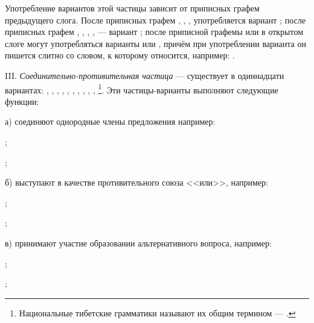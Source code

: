Употребление вариантов этой частицы зависит от приписных графем предыдущего слога. После приписных графем , , ,  употребляется вариант ; после приписных графем , , , ,  --- вариант ; после приписной графемы	 или в открытом слоге могут употребляться варианты  или , причём при употреблении варианта он пишется слитно со словом, к которому относится, например: .

III. \emph{Соединительно-противительная частица} --- существует в одиннадцати вариантах:
, , ,
, , ,
, , ,
, \footnote[49]{Национальные тибетские грамматики называют их общим термином --- .}.
Эти частицы-варианты выполняют следующие функции:

а) соединяют однородные члены предложения например:
\begin{prfsample}
	\item {};
	\item {};
\end{prfsample}

б) выступают в качестве противительного союза <<или>>, например:
\begin{prfsample}
	\item {};
	\item {};
\end{prfsample}

в) принимают участие образовании альтернативного вопроса, например:
\begin{prfsample}
	\item {};
	\item {};
\end{prfsample}

